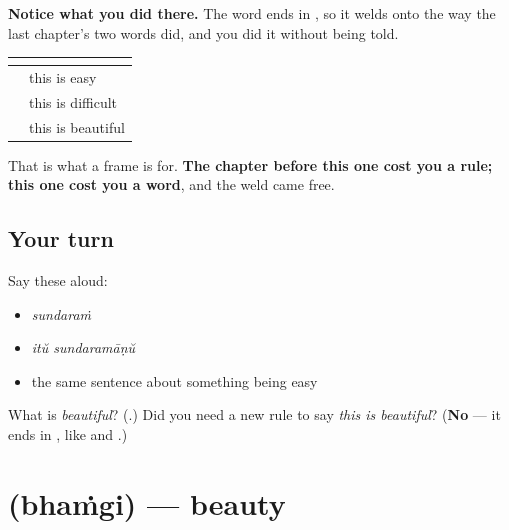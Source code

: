 \begin{grammarlens}[title={What you've built}]
\textbf{Notice what you did there.} The word ends in \textbf{}, so it welds onto \textbf{} the way the last chapter's two words did, and you did it without being told.

\noindent
\begin{tabularx}{\linewidth}{@{}>{\raggedright\arraybackslash}X>{\raggedright\arraybackslash}X@{}}
\toprule
\textbf{} & \textbf{} \\
\midrule
\textbf{\ml{ഇത്} \ml{എളുപ്പമാണ്}} & this is easy \\
\textbf{\ml{ഇത്} \ml{പ്രയാസമാണ്}} & this is difficult \\
\textbf{\ml{ഇത്} \ml{സുന്ദരമാണ്}} & this is beautiful \\
\bottomrule
\end{tabularx}

That is what a frame is for. \textbf{The chapter before this one cost you a rule; this one cost you a word}, and the weld came free.
\end{grammarlens}

\subsection*{Your turn}
Say these aloud:

\begin{itemize}
\raggedright
  \item \emph{sundaraṁ}
  \item \emph{itŭ sundaramāṇŭ}
  \item the same sentence about something being easy
\end{itemize}

\begin{tcolorbox}[breakable,colback=teal!4,colframe=teal!35!black,title={Before you move on}]
What is \emph{beautiful}? (\textbf{}.) Did you need a new rule to say \emph{this is beautiful}? (\textbf{No} — it ends in \textbf{}, like \textbf{} and \textbf{}.)
\end{tcolorbox}
\section[\texorpdfstring{\ml{ഭംഗി} (bhaṁgi)}{ഭംഗി (bhaṁgi)}]{ (bhaṁgi) — beauty}

\label{lesson:ML-C97-bhangi}



